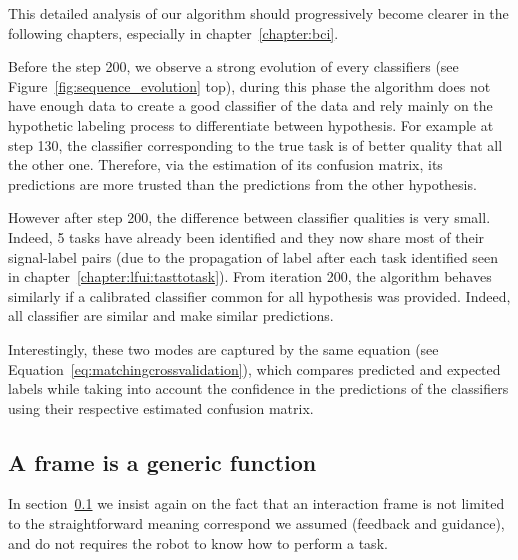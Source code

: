 This detailed analysis of our algorithm should progressively become clearer in the following chapters, especially in chapter~\ref{chapter:bci}.


Before the step 200, we observe a strong evolution of every classifiers (see Figure~\ref{fig:sequence_evolution} top), during this phase the algorithm does not have enough data to create a good classifier of the data and rely mainly on the hypothetic labeling process to differentiate between hypothesis. For example at step 130, the classifier corresponding to the true task is of better quality that all the other one. Therefore, via the estimation of its confusion matrix, its predictions are more trusted than the predictions from the other hypothesis.

However after step 200, the difference between classifier qualities is very small. Indeed, 5 tasks have already been identified and they now share most of their signal-label pairs (due to the propagation of label after each task identified seen in chapter~\ref{chapter:lfui:tasttotask}). From iteration 200, the algorithm behaves similarly if a calibrated classifier common for all hypothesis was provided. Indeed,  all classifier are similar and make similar predictions. 

Interestingly, these two modes are captured by the same equation (see Equation~\ref{eq:matchingcrossvalidation}), which compares predicted and expected labels while taking into account the confidence in the predictions of the classifiers using their respective estimated confusion matrix.



\subsection{A frame is a generic function}
\label{chapter:limitations:framegeneric}

In section~\ref{chapter:limitations:framegeneric} we insist again on the fact that an interaction frame is not limited to the straightforward meaning correspond we assumed (feedback and guidance), and do not requires the robot to know how to perform a task.



